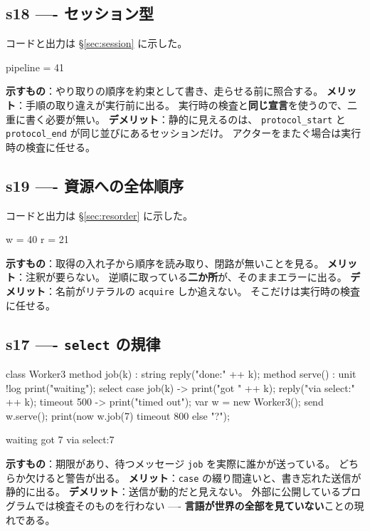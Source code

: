 \documentclass[11pt,a4paper]{ltjsarticle}
\theoremstyle{definition}
\theoremstyle{remark}
\begin{document}
\subsection{s18 ---- セッション型}
コードと出力は \S\ref{sec:session} に示した。
\begin{term}
pipeline = 41
\end{term}
\textbf{示すもの}：やり取りの順序を約束として書き、走らせる前に照合する。
\textbf{メリット}：手順の取り違えが実行前に出る。
実行時の検査と\textbf{同じ宣言}を使うので、二重に書く必要が無い。
\textbf{デメリット}：静的に見えるのは、
\texttt{protocol\_start} と \texttt{protocol\_end} が同じ並びにあるセッションだけ。
アクターをまたぐ場合は実行時の検査に任せる。

\subsection{s19 ---- 資源への全体順序}
コードと出力は \S\ref{sec:resorder} に示した。
\begin{term}
w = 40
r = 21
\end{term}
\textbf{示すもの}：取得の入れ子から順序を読み取り、閉路が無いことを見る。
\textbf{メリット}：注釈が要らない。
逆順に取っている\textbf{二か所}が、そのままエラーに出る。
\textbf{デメリット}：名前がリテラルの \texttt{acquire} しか追えない。
そこだけは実行時の検査に任せる。

\subsection{s17 ---- \texttt{select} の規律}
\begin{aipl}
class Worker3 {
  method job(k) : string { reply("done:" ++ k); }
  method serve() : unit !{log} {
    print("waiting");
    select {
      case job(k) -> { print("got " ++ k); reply("via select:" ++ k); }
      timeout 500 -> { print("timed out"); }
    }
  }
}
var w = new Worker3();
send w.serve();
print(now w.job(7) timeout 800 else "?");
\end{aipl}
\begin{term}
waiting
got 7
via select:7
\end{term}
\textbf{示すもの}：期限があり、待つメッセージ \texttt{job} を実際に誰かが送っている。
どちらか欠けると警告が出る。
\textbf{メリット}：\texttt{case} の綴り間違いと、書き忘れた送信が静的に出る。
\textbf{デメリット}：送信が動的だと見えない。
外部に公開しているプログラムでは検査そのものを行わない ----
\textbf{言語が世界の全部を見ていない}ことの現れである。
\end{document}
